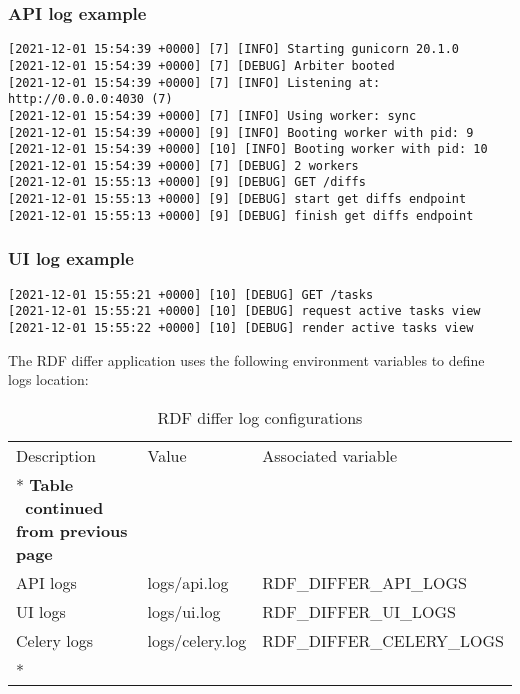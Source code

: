 \subsubsection{API log example}
\begin{lstlisting}
[2021-12-01 15:54:39 +0000] [7] [INFO] Starting gunicorn 20.1.0
[2021-12-01 15:54:39 +0000] [7] [DEBUG] Arbiter booted
[2021-12-01 15:54:39 +0000] [7] [INFO] Listening at: http://0.0.0.0:4030 (7)
[2021-12-01 15:54:39 +0000] [7] [INFO] Using worker: sync
[2021-12-01 15:54:39 +0000] [9] [INFO] Booting worker with pid: 9
[2021-12-01 15:54:39 +0000] [10] [INFO] Booting worker with pid: 10
[2021-12-01 15:54:39 +0000] [7] [DEBUG] 2 workers
[2021-12-01 15:55:13 +0000] [9] [DEBUG] GET /diffs
[2021-12-01 15:55:13 +0000] [9] [DEBUG] start get diffs endpoint
[2021-12-01 15:55:13 +0000] [9] [DEBUG] finish get diffs endpoint
\end{lstlisting}

\subsubsection{UI log example}
\begin{lstlisting}
[2021-12-01 15:55:21 +0000] [10] [DEBUG] GET /tasks
[2021-12-01 15:55:21 +0000] [10] [DEBUG] request active tasks view
[2021-12-01 15:55:22 +0000] [10] [DEBUG] render active tasks view
\end{lstlisting}

The RDF differ application uses the following environment variables to define logs location:

\begin{longtable}[c]{@{}p{3.5cm}p{3.5cm}l@{}}
	\toprule
	Description & Value           & Associated variable         \\* \midrule
	\endfirsthead
	\multicolumn{3}{c}%
	{{\bfseries Table \thetable\ continued from previous page}} \\
	\endhead
	\bottomrule
	\endfoot
	\endlastfoot
	API logs    & logs/api.log    & RDF\_DIFFER\_API\_LOGS      \\
	UI logs     & logs/ui.log     & RDF\_DIFFER\_UI\_LOGS       \\
	Celery logs & logs/celery.log & RDF\_DIFFER\_CELERY\_LOGS   \\* \bottomrule
	\caption{RDF differ log configurations}
	\label{tab:rdf-differ-log}                                  \\
\end{longtable}
